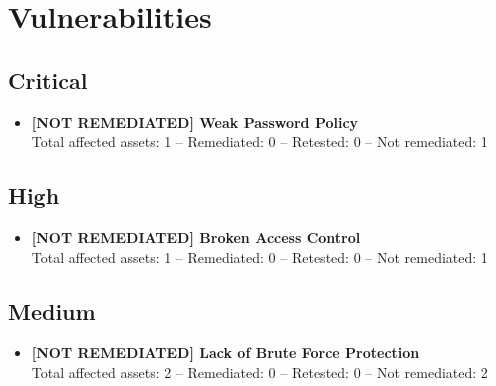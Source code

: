 \documentclass[a4paper,12pt]{article}
\begin{document}
\clearpage

\section{Vulnerabilities}

\subsection*{\color{BrickRed}Critical}
\begin{itemize}
    \item \textbf{[NOT REMEDIATED] Weak Password Policy} \\
    Total affected assets: 1 -- Remediated: 0 -- Retested: 0 -- Not remediated: 1
\end{itemize}

\subsection*{\color{Red}High}
\begin{itemize}
    \item \textbf{[NOT REMEDIATED] Broken Access Control} \\
    Total affected assets: 1 -- Remediated: 0 -- Retested: 0 -- Not remediated: 1
\end{itemize}

\subsection*{\color{Orange}Medium}
\begin{itemize}
    \item \textbf{[NOT REMEDIATED] Lack of Brute Force Protection} \\
    Total affected assets: 2 -- Remediated: 0 -- Retested: 0 -- Not remediated: 2
\end{itemize}
\end{document}
